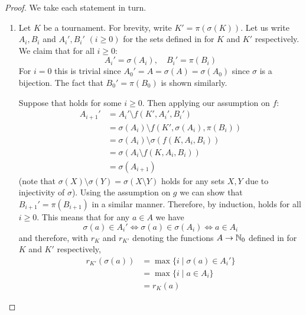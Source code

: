 \begin{proof}

    We take each statement in turn.

    \begin{enumerate}

    \item
    Let $K$ be a tournament. For brevity, write $K' = \pi(\sigma(K))$.  Let us
    write $A_i, B_i$ and $A_i', B_i'$ $(i \ge 0)$ for the sets defined in
     for $K$ and $K'$ respectively.  We claim that for
    all $i \ge 0$:
    \begin{equation}
        \label{tourn_eqn_interleaving_lemma_anon}
        A_i' = \sigma(A_i),
        \quad
        B_i' = \pi(B_i)
    \end{equation}
    For $i = 0$ this is trivial since $A_0' = A = \sigma(A) = \sigma(A_0)$
    since $\sigma$ is a bijection. The fact that $B_0' = \pi(B_0)$ is shown
    similarly.

    Suppose that  holds for some $i \ge
    0$. Then applying our assumption on $f$:
    \begin{align*}
        A_{i+1}'
        &= A_i' \setminus f(K', A_i', B_i') \\
        &= \sigma(A_i) \setminus f(K', \sigma(A_i), \pi(B_i)) \\
        &= \sigma(A_i) \setminus \sigma(f(K, A_i, B_i)) \\
        &= \sigma(A_i \setminus f(K, A_i, B_i)) \\
        &= \sigma(A_{i+1})
    \end{align*}
    (note that $\sigma(X) \setminus \sigma(Y) = \sigma(X \setminus Y)$ holds
    for any sets $X, Y$ due to injectivity of $\sigma$). Using the assumption
    on $g$ we can show that $B_{i+1}' = \pi(B_{i+1})$ in a similar manner.
    Therefore, by induction,  holds for
    all $i \ge 0$. This means that for any $a \in A$ we have
    \[
        \sigma(a) \in A_i'
        \iff
        \sigma(a) \in \sigma(A_i)
        \iff
        a \in A_i
    \]
    and therefore, with $r_K$ and $r_{K'}$ denoting the functions $A \to \mathbb{N}_0$
    defined in  for $K$ and $K'$ respectively,
    \begin{align*}
        r_{K'}(\sigma(a))
        &= \max\{i \mid \sigma(a) \in A_i'\} \\
        &= \max\{i \mid a \in A_i\} \\
        &= r_K(a)
    \end{align*}


\end{enumerate}
\end{proof}
